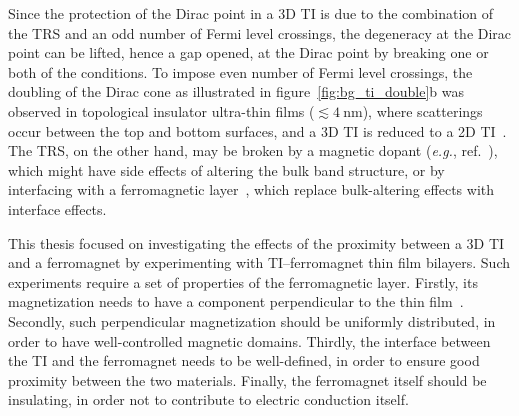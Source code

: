 Since the protection of the Dirac point in a 3D TI is due to the combination of the TRS and an odd number of Fermi level crossings, the degeneracy at the Dirac point can be lifted, hence a gap opened, at the Dirac point by breaking one or both of the conditions. To impose even number of Fermi level crossings, the doubling of the Dirac cone as illustrated in figure~\ref{fig:bg_ti_double}b was observed in topological insulator ultra-thin films ($\lesssim 4~\mathrm{nm}$), where scatterings occur between the top and bottom surfaces, and a 3D TI is reduced to a 2D TI~\cite{ARPES_thickness}. The TRS, on the other hand, may be broken by a magnetic dopant (\textit{e.g.}, ref.~\cite{Chang2013}), which might have side effects of altering the bulk band structure, or by interfacing with a ferromagnetic layer~\cite{TI_Col, QAH_TI_Yu, MnSe}, which replace bulk-altering effects with interface effects.

This thesis focused on investigating the effects of the proximity between a 3D TI and a ferromagnet by experimenting with TI--ferromagnet thin film bilayers. Such experiments require a set of properties of the ferromagnetic layer. Firstly, its magnetization needs to have a component perpendicular to the thin film~\cite{MnSe}. Secondly, such perpendicular magnetization should be uniformly distributed, in order to have well-controlled magnetic domains. Thirdly, the interface between the TI and the ferromagnet needs to be well-defined, in order to ensure good proximity between the two materials. Finally, the ferromagnet itself should be insulating, in order not to contribute to electric conduction itself.